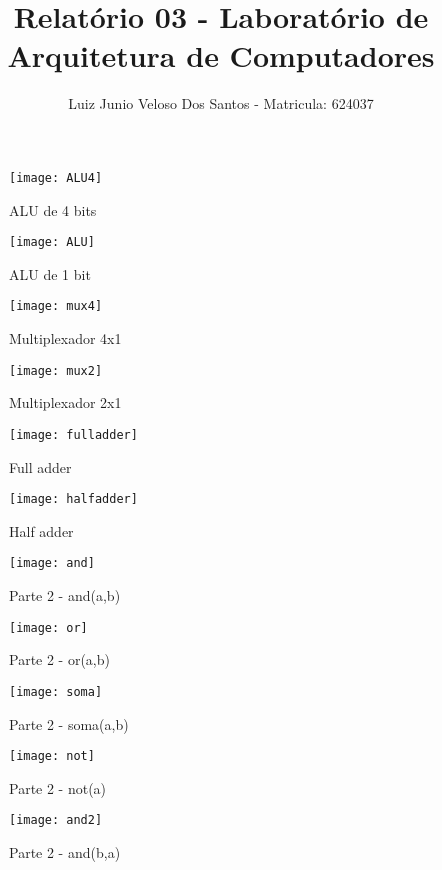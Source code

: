 \documentclass[a4paper,11pt]{article}
\title{\vspace{-4cm}Relatório 03 - Laboratório de Arquitetura de Computadores}
\author{Luiz Junio Veloso Dos Santos - Matricula: 624037}
\begin{document}
 

\maketitle

        \begin{figure}[ht]
            \caption{ALU de 4 bits}
            \centering
            \texttt{[image: ALU4]}
        \end{figure}
        \begin{figure}[ht]
            \caption{ALU de 1 bit}
            \centering
            \texttt{[image: ALU]}
        \end{figure}
        \begin{figure}[ht]
            \caption{Multiplexador 4x1}
            \centering
            \texttt{[image: mux4]}
        \end{figure}     
        \begin{figure}[ht]
            \caption{Multiplexador 2x1}
            \centering
            \texttt{[image: mux2]}
        \end{figure}       
        \begin{figure}[ht]
            \caption{Full adder}
            \centering
            \texttt{[image: fulladder]}
        \end{figure}       
        \begin{figure}[ht]
            \caption{Half adder}
            \centering
            \texttt{[image: halfadder]}
        \end{figure}
        \begin{figure}[ht]
            \caption{Parte 2 - and(a,b)}
            \centering
            \texttt{[image: and]}
        \end{figure}                   
        \begin{figure}[ht]
            \caption{Parte 2 - or(a,b)}
            \centering
            \texttt{[image: or]}
        \end{figure}                                 
        \begin{figure}[ht]
            \caption{Parte 2 - soma(a,b)}
            \centering
            \texttt{[image: soma]}
        \end{figure}                         
        \begin{figure}[ht]
            \caption{Parte 2 - not(a)}
            \centering
            \texttt{[image: not]}
        \end{figure}                         
        \begin{figure}[ht]
            \caption{Parte 2 - and(b,a)}
            \centering
            \texttt{[image: and2]}
        \end{figure}                         
\end{document}
